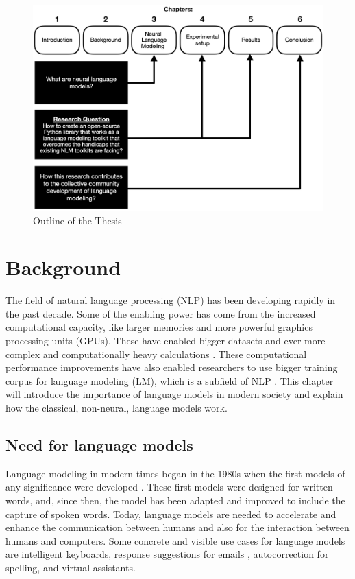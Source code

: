 \begin{figure}[h]
    \centering
    \includegraphics[width=\textwidth,height=\textheight,keepaspectratio]{outline}
    \caption{Outline of the Thesis}
    \label{fig:outline}
\end{figure}



\chapter{Background}
The field of natural language processing (NLP) has been developing rapidly in the past decade. Some of the enabling power has come from the increased computational capacity, like larger memories and more powerful graphics processing units (GPUs). These have enabled bigger datasets and ever more complex and computationally heavy calculations \parencite{chen2014efficient,colic2010exploring,you2019large}. These computational performance improvements have also enabled researchers to use bigger training corpus for language modeling (LM), which is a subfield of NLP \parencite{chelba2013one}. This chapter will introduce the importance of language models in modern society and explain how the classical, non-neural, language models work.


\section{Need for language models}

Language modeling in modern times began in the 1980s when the first models of any significance were developed \parencite{rosenfeld2000two}. These first models were designed for written words, and, since then, the model has been adapted and improved to include the capture of spoken words. Today, language models are needed to accelerate and enhance the communication between humans and also for the interaction between humans and computers. Some concrete and visible use cases for language models are intelligent keyboards, response suggestions for emails \parencite{kannan2016smart}, autocorrection for spelling, and virtual assistants.

